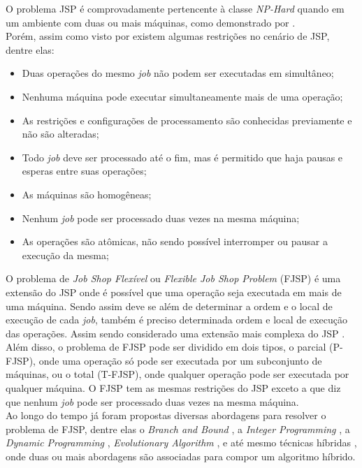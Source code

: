 O problema JSP é comprovadamente pertencente à classe \textit{NP-Hard} quando em um ambiente com duas ou mais máquinas, como demonstrado por \cite{Lenstra1979}.\\
Porém, assim como visto por \cite{Bagchi1999} existem algumas restrições no cenário de JSP, dentre elas:
\begin{itemize}
    \item Duas operações do mesmo \textit{job} não podem ser executadas em simultâneo;
    \item Nenhuma máquina pode executar simultaneamente mais de uma operação;
    \item As restrições e configurações de processamento são conhecidas previamente e não são alteradas;
    \item Todo \textit{job} deve ser processado até o fim, mas é permitido que haja pausas e esperas entre suas operações;
    \item As máquinas são homogêneas;
    \item Nenhum \textit{job} pode ser processado duas vezes na mesma máquina;
    \item As operações são atômicas, não sendo possível interromper ou pausar a execução da mesma;
\end{itemize}
O problema de \textit{Job Shop Flexível} ou \textit{Flexible Job Shop Problem} (FJSP) é uma extensão do JSP onde é possível que uma operação seja executada em mais de uma máquina. Sendo assim deve se além de determinar a ordem e o local de execução de cada \textit{job}, também é preciso determinada ordem e local de execução das operações. Assim sendo considerado uma extensão mais complexa do JSP \cite{Jansen2000}.\\
Além disso, o problema de FJSP pode ser dividido em dois tipos, o parcial (P-FJSP), onde uma operação só pode ser executada por um subconjunto de máquinas, ou o total (T-FJSP), onde qualquer operação pode ser executada por qualquer máquina. O FJSP tem as mesmas restrições do JSP exceto a que diz que nenhum \textit{job} pode ser processado duas vezes na mesma máquina.\\
Ao longo do tempo já foram propostas diversas abordagens para resolver o problema de FJSP, dentre elas o \textit{Branch and Bound} \cite{Nababan2008}, a 
\textit{Integer Programming} \cite{Pan2007}, a 
\textit{Dynamic Programming} \cite{Gromicho2012}, 
\textit{Evolutionary Algorithm} \cite{Pezzella2008}, e até mesmo técnicas híbridas \cite{Zhang2009}, onde duas ou mais abordagens são associadas para compor um algoritmo híbrido.\\
